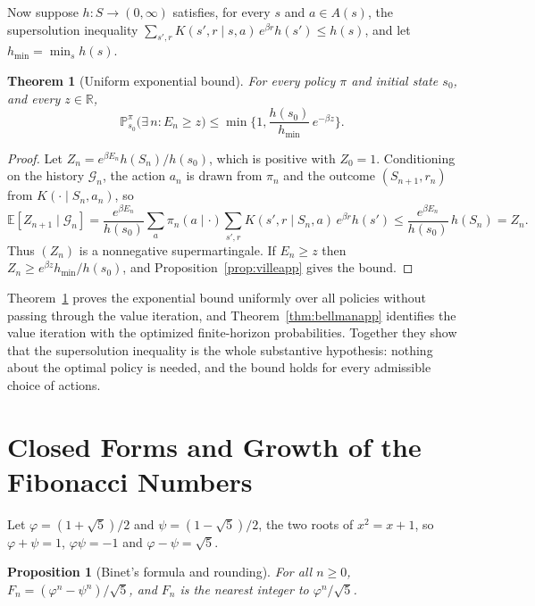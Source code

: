 \documentclass[11pt]{article}
\newtheorem{proposition}{Proposition}
\newtheorem{theorem}{Theorem}
\theoremstyle{definition}
\theoremstyle{remark}
\newcommand{\E}{\mathbb{E}}
\renewcommand{\Pr}{\mathbb{P}}
\begin{document}
Now suppose $h : S \to (0, \infty)$ satisfies, for every $s$ and $a \in A(s)$, the supersolution inequality $\sum_{s', r} K(s', r \mid s, a)\, e^{\beta r} h(s') \le h(s)$, and let $h_{\min} = \min_s h(s)$.

\begin{theorem}[Uniform exponential bound]\label{thm:supersolutionapp}
For every policy $\pi$ and initial state $s_0$, and every $z \in \mathbb{R}$,
\[
\Pr^\pi_{s_0}\big(\exists\, n : E_n \ge z\big) \le \min\Big\{1, \frac{h(s_0)}{h_{\min}}\, e^{-\beta z}\Big\}.
\]
\end{theorem}

\begin{proof}
Let $Z_n = e^{\beta E_n} h(S_n)/h(s_0)$, which is positive with $Z_0 = 1$. Conditioning on the history $\mathcal{G}_n$, the action $a_n$ is drawn from $\pi_n$ and the outcome $(S_{n+1}, r_n)$ from $K(\cdot \mid S_n, a_n)$, so
\[
\E[Z_{n+1} \mid \mathcal{G}_n] = \frac{e^{\beta E_n}}{h(s_0)} \sum_{a} \pi_n(a \mid \cdot) \sum_{s', r} K(s', r \mid S_n, a)\, e^{\beta r} h(s') \le \frac{e^{\beta E_n}}{h(s_0)}\, h(S_n) = Z_n .
\]
Thus $(Z_n)$ is a nonnegative supermartingale. If $E_n \ge z$ then $Z_n \ge e^{\beta z} h_{\min}/h(s_0)$, and Proposition~\ref{prop:villeapp} gives the bound.
\end{proof}

Theorem~\ref{thm:supersolutionapp} proves the exponential bound uniformly over all policies without passing through the value iteration, and Theorem~\ref{thm:bellmanapp} identifies the value iteration with the optimized finite-horizon probabilities. Together they show that the supersolution inequality is the whole substantive hypothesis: nothing about the optimal policy is needed, and the bound holds for every admissible choice of actions.

\section{Closed Forms and Growth of the Fibonacci Numbers}\label{app:fib}

Let $\varphi = (1 + \sqrt5)/2$ and $\psi = (1 - \sqrt5)/2$, the two roots of $x^2 = x + 1$, so $\varphi + \psi = 1$, $\varphi\psi = -1$ and $\varphi - \psi = \sqrt5$.

\begin{proposition}[Binet's formula and rounding]\label{prop:binet}
For all $n \ge 0$, $F_n = (\varphi^{n} - \psi^{n})/\sqrt5$, and $F_n$ is the nearest integer to $\varphi^{n}/\sqrt5$.
\end{proposition}
\end{document}
